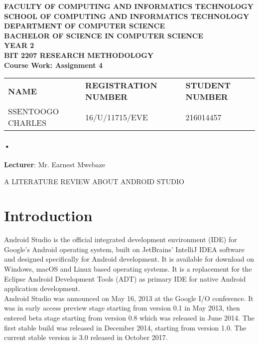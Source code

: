 \documentclass[7pt]{article}
\begin{document}
\begin{Huge}
\begin{center}
\begin{normalsize}

\textbf{FACULTY OF COMPUTING AND INFORMATICS TECHNOLOGY} \\
\textbf{SCHOOL OF COMPUTING AND INFORMATICS TECHNOLOGY} \\
\textbf{DEPARTMENT OF COMPUTER SCIENCE} \\
\textbf{BACHELOR OF SCIENCE IN COMPUTER SCIENCE} \\
\textbf{YEAR 2} \\
\textbf{BIT 2207 RESEARCH METHODOLOGY} \\
\textbf{Course Work: Assignment 4}\\
\end{normalsize}
\end{center}
\end{Huge}

\begin{center}
\begin{tabular}{l l l}
\textbf{NAME}  & \textbf{REGISTRATION NUMBER} & \textbf{STUDENT NUMBER} \\
SSENTOOGO CHARLES & 16/U/11715/EVE & 216014457 \\
\end{tabular}

\paragraph{•}
\textbf{Lecturer}: Mr. Earnest Mwebaze
\end{center}

\newpage

A LITERATURE REVIEW ABOUT ANDROID STUDIO
\section{Introduction}
Android Studio is the official integrated development environment (IDE) for Google's Android operating system, built on JetBrains' IntelliJ IDEA software and designed specifically for Android development.\cite{r1} It is available for download on Windows, macOS and Linux based operating systems. It is a replacement for the Eclipse Android Development Tools (ADT) as primary IDE for native Android application development.
\\
Android Studio was announced on May 16, 2013 at the Google I/O conference. It was in early access preview stage starting from version 0.1 in May 2013, then entered beta stage starting from version 0.8 which was released in June 2014. The first stable build was released in December 2014, starting from version 1.0. The current stable version is 3.0 released in October 2017.
\end{document}
